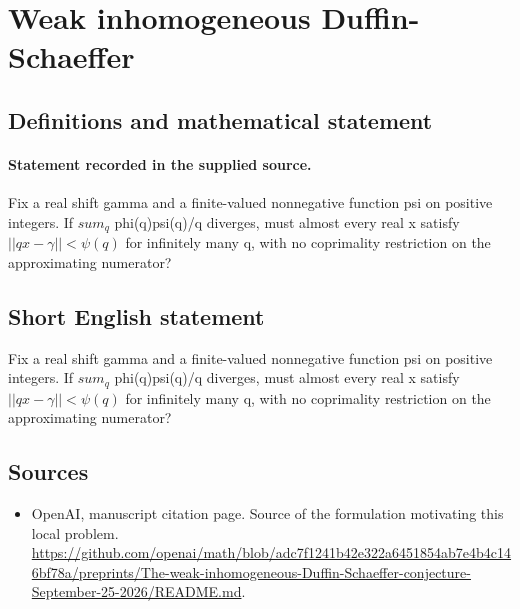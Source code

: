 \documentclass[11pt]{article}
\begin{document}
\section*{Weak inhomogeneous Duffin-Schaeffer}\label{30007289}
\subsection{Definitions and mathematical statement}
\paragraph{Statement recorded in the supplied source.}
Fix a real shift gamma and a finite-valued nonnegative function psi on positive integers. If $sum_q$ phi(q)psi(q)/q diverges, must almost every real x satisfy $||qx-\gamma ||<\psi (q)$ for infinitely many q, with no coprimality restriction on the approximating numerator?
\subsection{Short English statement}
Fix a real shift gamma and a finite-valued nonnegative function psi on positive integers. If $sum_q$ phi(q)psi(q)/q diverges, must almost every real x satisfy $||qx-\gamma ||<\psi (q)$ for infinitely many q, with no coprimality restriction on the approximating numerator?
\subsection{Sources}
\begin{itemize}
\item[S1] OpenAI, manuscript citation page. Source of the formulation motivating this local problem.
\url{https://github.com/openai/math/blob/adc7f1241b42e322a6451854ab7e4b4c146bf78a/preprints/The-weak-inhomogeneous-Duffin-Schaeffer-conjecture-September-25-2026/README.md}.
\end{itemize}
\end{document}

